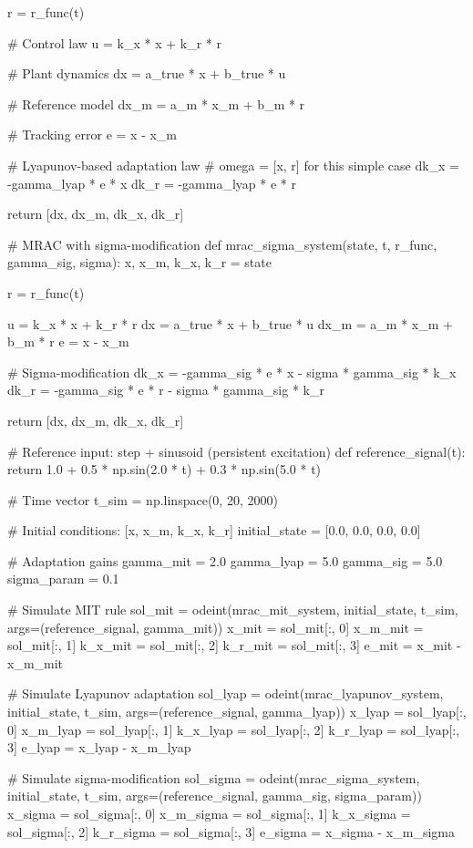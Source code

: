 \documentclass[a4paper, 11pt]{article}
\begin{document}
\begin{pycode}
    r = r_func(t)

    # Control law
    u = k_x * x + k_r * r

    # Plant dynamics
    dx = a_true * x + b_true * u

    # Reference model
    dx_m = a_m * x_m + b_m * r

    # Tracking error
    e = x - x_m

    # Lyapunov-based adaptation law
    # omega = [x, r] for this simple case
    dk_x = -gamma_lyap * e * x
    dk_r = -gamma_lyap * e * r

    return [dx, dx_m, dk_x, dk_r]

# MRAC with sigma-modification
def mrac_sigma_system(state, t, r_func, gamma_sig, sigma):
    x, x_m, k_x, k_r = state

    r = r_func(t)

    u = k_x * x + k_r * r
    dx = a_true * x + b_true * u
    dx_m = a_m * x_m + b_m * r
    e = x - x_m

    # Sigma-modification
    dk_x = -gamma_sig * e * x - sigma * gamma_sig * k_x
    dk_r = -gamma_sig * e * r - sigma * gamma_sig * k_r

    return [dx, dx_m, dk_x, dk_r]

# Reference input: step + sinusoid (persistent excitation)
def reference_signal(t):
    return 1.0 + 0.5 * np.sin(2.0 * t) + 0.3 * np.sin(5.0 * t)

# Time vector
t_sim = np.linspace(0, 20, 2000)

# Initial conditions: [x, x_m, k_x, k_r]
initial_state = [0.0, 0.0, 0.0, 0.0]

# Adaptation gains
gamma_mit = 2.0
gamma_lyap = 5.0
gamma_sig = 5.0
sigma_param = 0.1

# Simulate MIT rule
sol_mit = odeint(mrac_mit_system, initial_state, t_sim, args=(reference_signal, gamma_mit))
x_mit = sol_mit[:, 0]
x_m_mit = sol_mit[:, 1]
k_x_mit = sol_mit[:, 2]
k_r_mit = sol_mit[:, 3]
e_mit = x_mit - x_m_mit

# Simulate Lyapunov adaptation
sol_lyap = odeint(mrac_lyapunov_system, initial_state, t_sim, args=(reference_signal, gamma_lyap))
x_lyap = sol_lyap[:, 0]
x_m_lyap = sol_lyap[:, 1]
k_x_lyap = sol_lyap[:, 2]
k_r_lyap = sol_lyap[:, 3]
e_lyap = x_lyap - x_m_lyap

# Simulate sigma-modification
sol_sigma = odeint(mrac_sigma_system, initial_state, t_sim, args=(reference_signal, gamma_sig, sigma_param))
x_sigma = sol_sigma[:, 0]
x_m_sigma = sol_sigma[:, 1]
k_x_sigma = sol_sigma[:, 2]
k_r_sigma = sol_sigma[:, 3]
e_sigma = x_sigma - x_m_sigma


\end{pycode}
\end{document}

